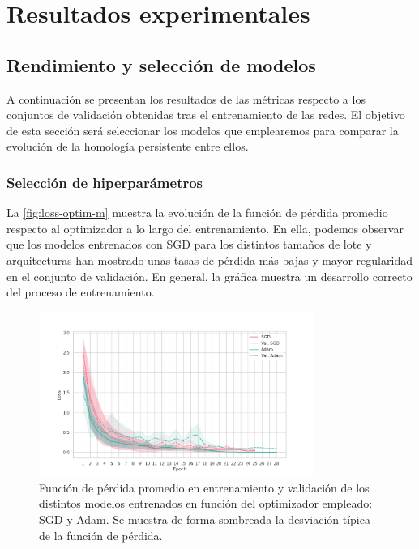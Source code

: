 
\chapter{Resultados experimentales}
\label{chapter:analisis}

\section{Rendimiento y selección de modelos}

A continuación se presentan los resultados de las métricas respecto a los
conjuntos de validación obtenidas tras el entrenamiento de las redes. El objetivo
de esta sección será seleccionar los modelos que emplearemos para comparar la evolución
de la homología persistente entre ellos.

\subsection{Selección de hiperparámetros}
\label{subsec:hiperparam}

La \autoref{fig:loss-optim-m} muestra la evolución de la función de pérdida
promedio respecto al optimizador a lo largo del entrenamiento. En ella, podemos
observar que los modelos entrenados con SGD para los distintos tamaños de lote y
arquitecturas han mostrado unas tasas de pérdida más bajas y mayor regularidad
en el conjunto de validación. En general, la gráfica muestra un desarrollo
correcto del proceso de entrenamiento.

\begin{figure}[H]
	\centering
	\includegraphics[width=0.8\textwidth]{img/loss-optimizer-marca.png}
	\caption{Función de pérdida promedio en entrenamiento y validación de los
		distintos modelos entrenados en función del optimizador empleado: SGD y Adam.
		Se muestra de forma sombreada la desviación típica de la función de pérdida.}
	\label{fig:loss-optim-m}
\end{figure}

